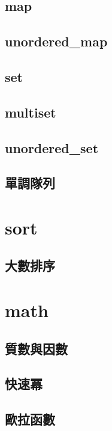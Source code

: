     \subsection{map}
        
    \subsection{unordered\_map}
        
    \subsection{set}
        
    \subsection{multiset}
        
    \subsection{unordered\_set}
        
    \subsection{單調隊列}
        

\section{sort}
    \subsection{大數排序}
        

\section{math}
        \subsection{質數與因數}
              
        \subsection{快速冪}
            
        \subsection{歐拉函數}
            
